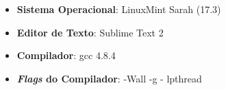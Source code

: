\begin{itemize}
	\item{\textbf{Sistema Operacional}: LinuxMint Sarah (17.3)}
	\item{\textbf{Editor de Texto}: Sublime Text 2}
	\item{\textbf{Compilador}: gcc 4.8.4}
	\item{\textbf{\emph{Flags} do Compilador}: -Wall -g - lpthread}
\end{itemize}
